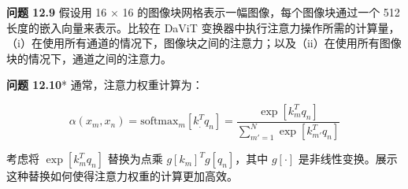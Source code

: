 \textbf{问题 12.9} 假设用 16 × 16 的图像块网格表示一幅图像，每个图像块通过一个 512 长度的嵌入向量来表示。比较在 DaViT 变换器中执行注意力操作所需的计算量，（i）在使用所有通道的情况下，图像块之间的注意力；以及（ii）在使用所有图像块的情况下，通道之间的注意力。

\textbf{问题 12.10}* 通常，注意力权重计算为：

\begin{equation}
\alpha(x_m, x_n) = \text{softmax}_m [k_.^T q_n] = \frac{\exp[k_m^T q_n]}{\sum_{m'=1}^N \exp[k_{m'}^T q_n]} 
\end{equation}


考虑将 \(\exp \left[ k_m^T q_n \right]\) 替换为点乘 \(g[k_m]^T g[q_n]\)，其中 \(g[\cdot]\) 是非线性变换。展示这种替换如何使得注意力权重的计算更加高效。

